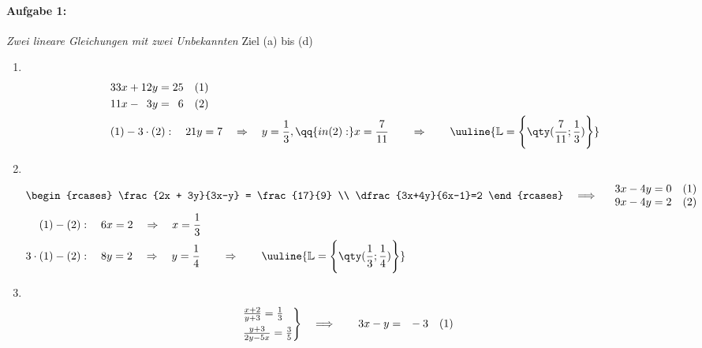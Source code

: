 \paragraph{Aufgabe 1: } \emph{Zwei lineare Gleichungen mit zwei Unbekannten} \hfill Ziel (a) bis (d)\\[0.2cm]
\begin{enumerate}[label=(\alph*)]
    \item $~$\\[-1.45 cm]\begin{align*}
        &33x+12y=25 \quad (1) \\ 
        &11x-\hphantom{1}3y=\hphantom{2}6 \quad (2) \\
        &(1) - 3\cdot (2): \quad 21y = 7 \quad\Rightarrow \quad y = \frac{1}{3}, \qq{in (2):} x = \frac{7}{11} \qquad \Rightarrow \qquad \uuline{\mathbb{L} = \Bigg\{\qty(\frac{7}{11};\frac{1}{3})\Bigg\}}
    \end{align*}
    \item $~$\\[-1.45cm] 
    \begin{align*}
        &\begin{rcases}
            \frac{2x + 3y}{3x-y} = \frac{17}{9} \\
            \dfrac{3x+4y}{6x-1}=2
        \end{rcases} \quad \Longrightarrow \quad 
        \begin{array}{l}
            3x-4y = 0 \quad (1) \\
            9x -4y = 2 \quad (2)
        \end{array} \\
        &\hphantom{3\cdot}\;\,(1) -(2): \quad 6x = 2 \quad\Rightarrow\quad x = \frac{1}{3}\\
        &3\cdot(1) -(2): \quad 8y = 2 \quad\Rightarrow\quad y = \frac{1}{4} \qquad \Rightarrow \qquad \uuline{\mathbb{L} = \Bigg\{\qty(\frac{1}{3};\frac{1}{4})\Bigg\}}
    \end{align*}
    \item $~$\\[-1.45cm] 
    \begin{align*}
        &\begin{rcases}
            \frac{x+2}{y+3}=\frac{1}{3} \\
            \frac{y+3}{2y-5x}=\frac{3}{5}
        \end{rcases} \quad \Longrightarrow \quad 
        \begin{array}{l}
            \hphantom{1}3x-y = \hphantom{1}-3 \quad (1) \\

\end{array}
\end{align*}
\end{enumerate}
